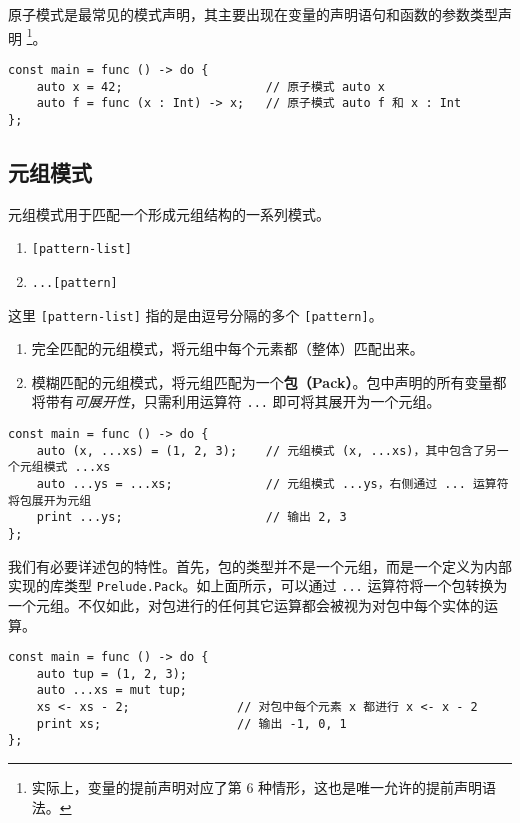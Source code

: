 原子模式是最常见的模式声明，其主要出现在变量的声明语句和函数的参数类型声明 \footnote{实际上，变量的提前声明对应了第 6 种情形，这也是唯一允许的提前声明语法。}。

\begin{lstlisting}
const main = func () -> do {
    auto x = 42;                    // 原子模式 auto x
    auto f = func (x : Int) -> x;   // 原子模式 auto f 和 x : Int
};
\end{lstlisting}


\subsection{元组模式}

元组模式用于匹配一个形成元组结构的一系列模式。

\begin{grammar} \label{grm:tuple-pattern}
\begin{enumerate}
    \item \lstinline![pattern-list]!
    \item \lstinline!...[pattern]!
\end{enumerate}
\end{grammar}

这里 \lstinline![pattern-list]! 指的是由逗号分隔的多个 \lstinline![pattern]!。

\begin{enumerate}
    \item 完全匹配的元组模式，将元组中每个元素都（整体）匹配出来。
    \item 模糊匹配的元组模式，将元组匹配为一个\textbf{包（Pack）}。包中声明的所有变量都将带有\emph{可展开性}，只需利用运算符 \lstinline!...! 即可将其展开为一个元组。
\end{enumerate}

\begin{lstlisting}
const main = func () -> do {
    auto (x, ...xs) = (1, 2, 3);    // 元组模式 (x, ...xs)，其中包含了另一个元组模式 ...xs
    auto ...ys = ...xs;             // 元组模式 ...ys，右侧通过 ... 运算符将包展开为元组
    print ...ys;                    // 输出 2, 3
};
\end{lstlisting}

我们有必要详述包的特性。首先，包的类型并不是一个元组，而是一个定义为内部实现的库类型 \lstinline!Prelude.Pack!。如上面所示，可以通过 \lstinline!...! 运算符将一个包转换为一个元组。不仅如此，对包进行的任何其它运算都会被视为对包中每个实体的运算。

\begin{lstlisting}
const main = func () -> do {
	auto tup = (1, 2, 3);
	auto ...xs = mut tup;
	xs <- xs - 2;				// 对包中每个元素 x 都进行 x <- x - 2
	print xs;					// 输出 -1, 0, 1
};
\end{lstlisting}

